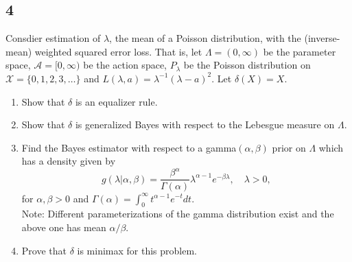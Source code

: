 \documentclass[12pt]{article}
\begin{document}
\newpage
\subsection*{4}
\begin{tcolorbox}
  Consdier estimation of $\lambda$, the mean of a Poisson distribution, with the (inverse-mean) weighted squared error loss.
  That is, let $\Lambda=(0,\infty)$ be the parameter space, $\mathcal{A}=[0,\infty)$ be the action space, $P_\lambda$ be the Poisson distribution on $\mathcal{X}=\{0,1,2,3,\ldots\}$ and $L(\lambda,a)=
  \lambda^{-1}(\lambda-a)^2$.  Let $\delta(X)=X$.
  \begin{enumerate}[label=(\alph*)]
    \item Show that $\delta$ is an equalizer rule.
    \item Show that $\delta$ is generalized Bayes with respect to the Lebesgue measure on $\Lambda$.
    \item Find the Bayes estimator with respect to a gamma$(\alpha,\beta)$ prior on $\Lambda$ which has a density given by
      \[
        g(\lambda|\alpha,\beta) = \frac{\beta^\alpha}{\Gamma(\alpha)} \lambda^{\alpha-1} e^{-\beta \lambda},\quad \lambda>0,
      \]
      for $\alpha,\beta>0$ and $\Gamma(\alpha) = \int_0^\infty t^{\alpha-1} e^{-t}dt$.\\[.2cm]
      Note: Different parameterizations of the gamma distribution exist and the above one has mean $\alpha/\beta$.
    \item Prove that $\delta$ is minimax for this problem.
  \end{enumerate}
\end{tcolorbox}
\end{document}
